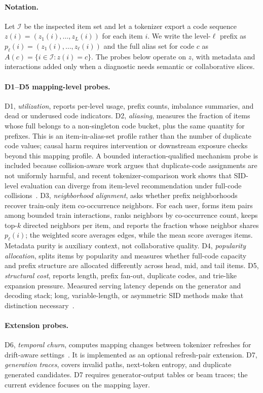 \paragraph{Notation.}
Let \(\mathcal{I}\) be the inspected item set and let a tokenizer export a code
sequence \(z(i)=(z_1(i),\ldots,z_L(i))\) for each item \(i\). We write the
level-\(\ell\) prefix as \(p_\ell(i)=(z_1(i),\ldots,z_\ell(i))\) and the full
alias set for code \(c\) as \(A(c)=\{i\in\mathcal{I}:z(i)=c\}\). The probes
below operate on \(z\), with metadata and interactions added only when a
diagnostic needs semantic or collaborative slices.

\paragraph{D1--D5 mapping-level probes.}
D1, \emph{utilization}, reports per-level usage, prefix counts, imbalance
summaries, and dead or underused code indicators. D2, \emph{aliasing},
measures the fraction of items whose full \sid belongs to a non-singleton code
bucket, plus the same quantity for prefixes. This is an item-in-alias-set
profile rather than the number of duplicate code values; causal harm requires
intervention or downstream exposure checks beyond this mapping profile. A
bounded interaction-qualified mechanism probe is included because collision-aware work argues that duplicate-code
assignments are not uniformly harmful, and recent tokenizer-comparison work
shows that SID-level evaluation can diverge from item-level recommendation under
full-code collisions~\cite{hu2026quasid,zhang2026sidreliability}. D3,
\emph{neighborhood alignment}, asks whether prefix neighborhoods recover
train-only item co-occurrence neighbors. For each user, \tool forms item pairs
among bounded train interactions, ranks neighbors by co-occurrence count, keeps
top-\(k\) directed neighbors per item, and reports the fraction whose neighbor
shares \(p_\ell(i)\); the weighted score averages edges, while the mean score
averages items. Metadata purity is auxiliary context, not collaborative
quality. D4, \emph{popularity allocation}, splits items by popularity and measures whether
full-code capacity and prefix structure are allocated differently across head,
mid, and tail items. D5, \emph{structural cost}, reports \sid length, prefix
fan-out, duplicate codes, and trie-like expansion pressure. Measured serving
latency depends on the generator and decoding stack; long, variable-length, or asymmetric SID methods make that distinction
necessary~\cite{xia2026acerec,cheng2026capsid,huang2026asymrec,zhang2026hgrec,wang2026sa2crq,hou2026expressiveness}.

\paragraph{Extension probes.}
D6, \emph{temporal churn}, computes mapping changes between tokenizer
refreshes for drift-aware settings~\cite{feng2026dact,baikalov2026staleness}.
It is implemented as an optional refresh-pair extension.
D7, \emph{generation traces}, covers invalid paths, next-token entropy, and
duplicate generated candidates. D7 requires generator-output tables or beam
traces; the current evidence focuses on the mapping layer.
